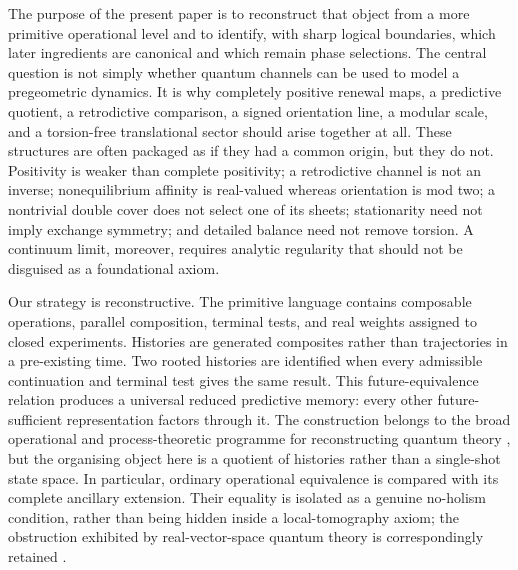 \documentclass[11pt]{article}
\theoremstyle{definition}
\theoremstyle{remark}
\begin{document}
The purpose of the present paper is to reconstruct that object from a more
primitive operational level and to identify, with sharp logical boundaries,
which later ingredients are canonical and which remain phase selections.  The
central question is not simply whether quantum channels can be used to model a
pregeometric dynamics.  It is why completely positive renewal maps, a
predictive quotient, a retrodictive comparison, a signed orientation line, a
modular scale, and a torsion-free translational sector should arise together
at all.  These structures are often packaged as if they had a common origin,
but they do not.  Positivity is weaker than complete positivity; a
retrodictive channel is not an inverse; nonequilibrium affinity is real-valued
whereas orientation is mod two; a nontrivial double cover does not select one
of its sheets; stationarity need not imply exchange symmetry; and detailed
balance need not remove torsion.  A continuum limit, moreover, requires
analytic regularity that should not be disguised as a foundational axiom.

Our strategy is reconstructive.  The primitive language contains composable
operations, parallel composition, terminal tests, and real weights assigned
to closed experiments.  Histories are generated composites rather than
trajectories in a pre-existing time.  Two rooted histories are identified
when every admissible continuation and terminal test gives the same result.
This future-equivalence relation produces a universal reduced predictive
memory: every other future-sufficient representation factors through it.  The
construction belongs to the broad operational and process-theoretic programme
for reconstructing quantum theory
\cite{Hardy2001,ChiribellaDAPS2009,ChiribellaDArianoPerinotti2011,MasanesMuller2011,DakicBrukner2011,DArianoChiribellaPerinotti2017,SelbyScandoloCoecke2021,vandeWetering2019},
but the organising object here is a quotient of histories rather than a
single-shot state space.  In particular, ordinary operational equivalence is
compared with its complete ancillary extension.  Their equality is isolated
as a genuine no-holism condition, rather than being hidden inside a local-tomography axiom; the obstruction
exhibited by real-vector-space quantum theory is correspondingly retained
\cite{BarnumWilce2014,HardyWootters2012,delaTorre2012}.
\end{document}
